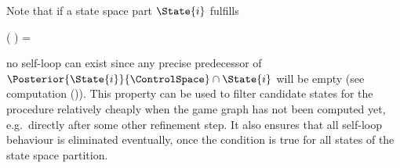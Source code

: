     Note that if a state space part $\State{i}$ fulfills

    \startformula
        ( \cap {}) \ominus \RandomSpace = \emptyset \EndComma
    \stopformula

    no self-loop can exist since any precise predecessor of $\Posterior{\State{i}}{\ControlSpace} \cap \State{i}$ will be empty (see computation (\in[TODO])).
    This property can be used to filter candidate states for the procedure relatively cheaply when the game graph has not been computed yet, e.g.\ directly after some other refinement step.
    It also ensures that all self-loop behaviour is eliminated eventually, once the condition is true for all states of the state space partition.

\stopsubsection

